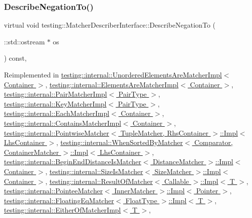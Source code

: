\subsubsection{\texorpdfstring{Describe\+Negation\+To()}{DescribeNegationTo()}}
{\footnotesize\ttfamily virtual void testing\+::\+Matcher\+Describer\+Interface\+::\+Describe\+Negation\+To (\begin{DoxyParamCaption}\item[{\+::std\+::ostream $\ast$}]{os }\end{DoxyParamCaption}) const\hspace{0.3cm}{\ttfamily [inline]}, {\ttfamily [virtual]}}



Reimplemented in \hyperlink{classtesting_1_1internal_1_1UnorderedElementsAreMatcherImpl_af2185915595c02d6132ba5f3f9ccb6cd}{testing\+::internal\+::\+Unordered\+Elements\+Are\+Matcher\+Impl$<$ Container $>$}, \hyperlink{classtesting_1_1internal_1_1ElementsAreMatcherImpl_ab8485a836eb7ffabc43b05187e58616d}{testing\+::internal\+::\+Elements\+Are\+Matcher\+Impl$<$ Container $>$}, \hyperlink{classtesting_1_1internal_1_1PairMatcherImpl_a41ef8b1ae031cf342a380e2f2fb2a526}{testing\+::internal\+::\+Pair\+Matcher\+Impl$<$ Pair\+Type $>$}, \hyperlink{classtesting_1_1internal_1_1KeyMatcherImpl_a4be87d136547063a16777151b691046d}{testing\+::internal\+::\+Key\+Matcher\+Impl$<$ Pair\+Type $>$}, \hyperlink{classtesting_1_1internal_1_1EachMatcherImpl_a5be5bbd61f7a350fcbe30deea4c2a0c6}{testing\+::internal\+::\+Each\+Matcher\+Impl$<$ Container $>$}, \hyperlink{classtesting_1_1internal_1_1ContainsMatcherImpl_a9d7867110ba3f346399f23e41cc75c5b}{testing\+::internal\+::\+Contains\+Matcher\+Impl$<$ Container $>$}, \hyperlink{classtesting_1_1internal_1_1PointwiseMatcher_1_1Impl_a26d3a829149e4c497aaced42aad7b247}{testing\+::internal\+::\+Pointwise\+Matcher$<$ Tuple\+Matcher, Rhs\+Container $>$\+::\+Impl$<$ Lhs\+Container $>$}, \hyperlink{classtesting_1_1internal_1_1WhenSortedByMatcher_1_1Impl_a0a59f77fdbb88a6326e5aba671f2aa3e}{testing\+::internal\+::\+When\+Sorted\+By\+Matcher$<$ Comparator, Container\+Matcher $>$\+::\+Impl$<$ Lhs\+Container $>$}, \hyperlink{classtesting_1_1internal_1_1BeginEndDistanceIsMatcher_1_1Impl_a359711f21b6f116a5233fca78736fa47}{testing\+::internal\+::\+Begin\+End\+Distance\+Is\+Matcher$<$ Distance\+Matcher $>$\+::\+Impl$<$ Container $>$}, \hyperlink{classtesting_1_1internal_1_1SizeIsMatcher_1_1Impl_a24b76fc2ac7b8d58cb5c7a3c5d5d35ab}{testing\+::internal\+::\+Size\+Is\+Matcher$<$ Size\+Matcher $>$\+::\+Impl$<$ Container $>$}, \hyperlink{classtesting_1_1internal_1_1ResultOfMatcher_1_1Impl_a0cce532e88284a2939fc6b63cadc51a6}{testing\+::internal\+::\+Result\+Of\+Matcher$<$ Callable $>$\+::\+Impl$<$ T $>$}, \hyperlink{classtesting_1_1internal_1_1PointeeMatcher_1_1Impl_af37adcdf3e5218ca9e1954515bc135c8}{testing\+::internal\+::\+Pointee\+Matcher$<$ Inner\+Matcher $>$\+::\+Impl$<$ Pointer $>$}, \hyperlink{classtesting_1_1internal_1_1FloatingEqMatcher_1_1Impl_a3eff238a812f4a105df1222a28f6cdbf}{testing\+::internal\+::\+Floating\+Eq\+Matcher$<$ Float\+Type $>$\+::\+Impl$<$ T $>$}, \hyperlink{classtesting_1_1internal_1_1EitherOfMatcherImpl_ab5a4eac981acde377a4fd344507b1d71}{testing\+::internal\+::\+Either\+Of\+Matcher\+Impl$<$ T $>$}, 